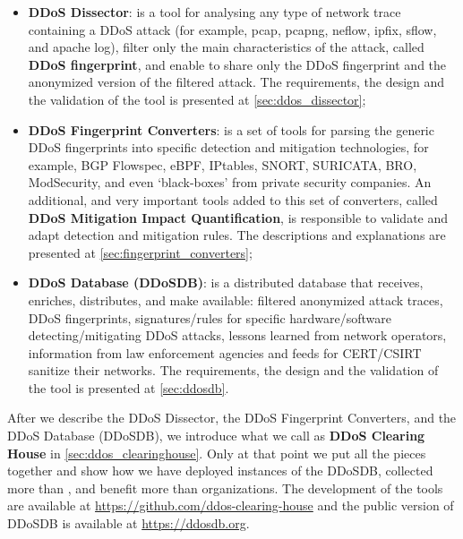 \begin{itemize}
	\item \textbf{DDoS Dissector}: is a tool for analysing any type of network trace containing a DDoS attack (for example, pcap, pcapng, neflow, ipfix, sflow, and apache log), filter only the main characteristics of the attack, called \textbf{DDoS fingerprint}, and enable to share only the DDoS fingerprint and the anonymized version of the filtered attack. The requirements, the design and the validation of the tool is presented at \autoref{sec:ddos_dissector}; %
	
	\item\textbf{DDoS Fingerprint Converters}: is a set of tools for parsing the generic DDoS fingerprints into specific detection and mitigation technologies, for example, BGP Flowspec, eBPF, IPtables, SNORT, SURICATA, BRO, ModSecurity, and even ‘black-boxes’ from private security companies. An additional, and very important tools added to this set of converters, called \textbf{DDoS Mitigation Impact Quantification}, is responsible to validate and adapt detection and mitigation rules. The descriptions and explanations are presented at \autoref{sec:fingerprint_converters};
	
	\item \textbf{DDoS Database (DDoSDB)}: is a distributed database that receives, enriches, distributes, and make available: filtered anonymized attack traces, DDoS fingerprints, signatures/rules for specific hardware/software detecting/mitigating DDoS attacks, lessons learned from network operators, information from law enforcement agencies and feeds for CERT/CSIRT sanitize their networks. The requirements, the design and the validation of the tool is presented at \autoref{sec:ddosdb}.
\end{itemize}

After we describe the DDoS Dissector, the DDoS Fingerprint Converters, and the DDoS Database (DDoSDB), we introduce what we call as \textbf{DDoS Clearing House} in \autoref{sec:ddos_clearinghouse}. Only at that point we put all the pieces together and show how we have deployed \DDOSDBINSTANCES instances of the DDoSDB, collected more than \DDOSDBMULTIVECTORKEYS, and benefit more than \PROTECTEDORGANISATIONS organizations. The development of the tools are available at \url{https://github.com/ddos-clearing-house} and the public version of DDoSDB is available at \url{https://ddosdb.org}.


